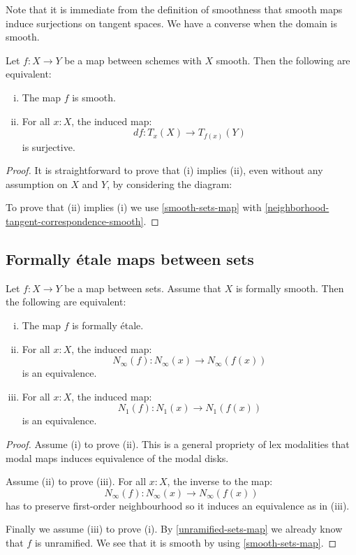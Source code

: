 Note that it is immediate from the definition of smoothness that smooth maps induce surjections on tangent spaces. We have a converse when the domain is smooth.

\begin{corollary}\label{smooth-schemes-iff-submersion}
Let $f:X\to Y$ be a map between schemes with $X$ smooth. Then the following are equivalent:
\begin{enumerate}[(i)] 
\item The map $f$ is smooth.
\item For all $x:X$, the induced map:
\[df : T_x(X)\to T_{f(x)}(Y)\]
is surjective.
\end{enumerate}
\end{corollary}

\begin{proof}
It is straightforward to prove that (i) implies (ii), even without any assumption on $X$ and $Y$, by considering the diagram:
 \begin{center}
    \end{center}
To prove that (ii) implies (i) we use \cref{smooth-sets-map} with \cref{neighborhood-tangent-correspondence-smooth}.
\end{proof}

\subsection{Formally étale maps between sets}

\begin{proposition}\label{etale-sets-map}
Let $f:X\to Y$ be a map between sets. Assume that $X$ is formally smooth. Then the following are equivalent:
\begin{enumerate}[(i)]
\item The map $f$ is formally étale. 
\item For all $x:X$, the induced map:
\[N_\infty(f) : N_\infty(x)\to N_\infty(f(x))\]
is an equivalence.
\item For all $x:X$, the induced map:
\[N_1(f) : N_1(x)\to N_1(f(x))\]
is an equivalence.
\end{enumerate}
\end{proposition}

\begin{proof}
Assume (i) to prove (ii). This is a general propriety of lex modalities that modal maps induces equivalence of the modal disks.

Assume (ii) to prove (iii). For all $x:X$, the inverse to the map: 
\[N_\infty(f) : N_\infty(x)\to N_\infty(f(x))\]
has to preserve first-order neighbourhood so it induces an equivalence as in (iii).

Finally we assume (iii) to prove (i). By \cref{unramified-sets-map} we already know that $f$ is unramified. We see that it is smooth by using \cref{smooth-sets-map}.
\end{proof}

